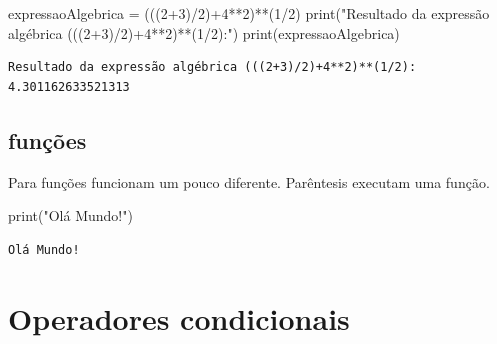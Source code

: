 \documentclass[
  letterpaper,
  DIV=11,
  numbers=noendperiod]{scrreprt}
\newenvironment{Shaded}{\begin{snugshade}}{\end{snugshade}}
\newcommand{\BuiltInTok}[1]{\textcolor[rgb]{0.00,0.23,0.31}{#1}}
\newcommand{\DecValTok}[1]{\textcolor[rgb]{0.68,0.00,0.00}{#1}}
\newcommand{\NormalTok}[1]{\textcolor[rgb]{0.00,0.23,0.31}{#1}}
\newcommand{\OperatorTok}[1]{\textcolor[rgb]{0.37,0.37,0.37}{#1}}
\newcommand{\StringTok}[1]{\textcolor[rgb]{0.13,0.47,0.30}{#1}}
\begin{document}
\begin{Shaded}
\begin{Highlighting}[]
\NormalTok{expressaoAlgebrica }\OperatorTok{=}\NormalTok{ (((}\DecValTok{2}\OperatorTok{+}\DecValTok{3}\NormalTok{)}\OperatorTok{/}\DecValTok{2}\NormalTok{)}\OperatorTok{+}\DecValTok{4}\OperatorTok{**}\DecValTok{2}\NormalTok{)}\OperatorTok{**}\NormalTok{(}\DecValTok{1}\OperatorTok{/}\DecValTok{2}\NormalTok{)}
\BuiltInTok{print}\NormalTok{(}\StringTok{"Resultado da expressão algébrica (((2+3)/2)+4**2)**(1/2):"}\NormalTok{)}
\BuiltInTok{print}\NormalTok{(expressaoAlgebrica)}
\end{Highlighting}
\end{Shaded}

\begin{tcolorbox}[enhanced jigsaw, breakable, leftrule=.75mm, left=2mm, opacityback=0, bottomrule=.15mm, toprule=.15mm, rightrule=.15mm, arc=.35mm, colback=white]

\begin{verbatim}
Resultado da expressão algébrica (((2+3)/2)+4**2)**(1/2):
4.301162633521313
\end{verbatim}

\end{tcolorbox}

\hypertarget{funuxe7uxf5es}{%
\subsection{funções}\label{funuxe7uxf5es}}

Para funções funcionam um pouco diferente. Parêntesis executam uma
função.

\begin{Shaded}
\begin{Highlighting}[]
    \BuiltInTok{print}\NormalTok{(}\StringTok{"Olá Mundo!"}\NormalTok{)}
\end{Highlighting}
\end{Shaded}

\begin{tcolorbox}[enhanced jigsaw, breakable, leftrule=.75mm, left=2mm, opacityback=0, bottomrule=.15mm, toprule=.15mm, rightrule=.15mm, arc=.35mm, colback=white]

\begin{verbatim}
Olá Mundo!
\end{verbatim}

\end{tcolorbox}

\hypertarget{operadores-condicionais}{%
\section{Operadores condicionais}\label{operadores-condicionais}}
\end{document}
